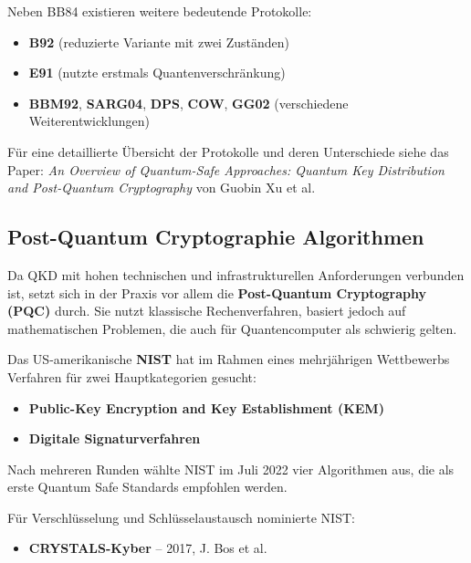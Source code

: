 \noindent Neben BB84 existieren weitere bedeutende Protokolle:

\begin{itemize}
  \item \textbf{B92} (reduzierte Variante mit zwei Zuständen)
  \item \textbf{E91} (nutzte erstmals Quantenverschränkung)
  \item \textbf{BBM92}, \textbf{SARG04}, \textbf{DPS}, \textbf{COW}, \textbf{GG02} (verschiedene Weiterentwicklungen)
\end{itemize}

Für eine detaillierte Übersicht der Protokolle und deren Unterschiede siehe das Paper:
\textit{An Overview of Quantum-Safe Approaches: Quantum Key Distribution and Post-Quantum Cryptography} von Guobin Xu et al.

\subsection{Post-Quantum Cryptographie Algorithmen}

Da QKD mit hohen technischen und infrastrukturellen Anforderungen verbunden ist, setzt sich in der Praxis vor allem die \textbf{Post-Quantum Cryptography (PQC)} durch. Sie nutzt klassische Rechenverfahren, basiert jedoch auf mathematischen Problemen, die auch für Quantencomputer als schwierig gelten.

Das US-amerikanische \textbf{NIST} hat im Rahmen eines mehrjährigen Wettbewerbs Verfahren für zwei Hauptkategorien gesucht:

\begin{itemize}
  \item \textbf{Public-Key Encryption and Key Establishment (KEM)}
  \item \textbf{Digitale Signaturverfahren}
\end{itemize}

\noindent Nach mehreren Runden wählte NIST im Juli 2022 vier Algorithmen aus, die als erste Quantum Safe Standards empfohlen werden.

\noindent Für Verschlüsselung und Schlüsselaustausch nominierte NIST:

\begin{itemize}
  \item \textbf{CRYSTALS-Kyber} – 2017, J. Bos et al.
\end{itemize}

\vspace{0.5em} %

